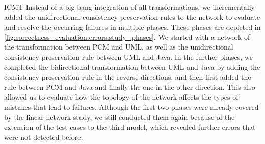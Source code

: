 \begin{copiedFrom}{ICMT}
Instead of a big bang integration of all transformations, we incrementally added the unidirectional consistency preservation rules to the network to evaluate and resolve the occurring failures in multiple phases.
These phases are depicted in \autoref{fig:correctness_evaluation:errors:study_phases}.
We started with a network of the transformation between \gls{PCM} and \gls{UML}, as well as the unidirectional consistency preservation rule between \gls{UML} and Java.
In the further phases, we completed the bidirectional transformation between \gls{UML} and Java by adding the consistency preservation rule in the reverse directions, and then first added the rule between \gls{PCM} and Java and finally the one in the other direction.
This also allowed us to evaluate how the topology of the network affects the types of mistakes that lead to failures.
Although the first two phases were already covered by the linear network study, we still conducted them again because of the extension of the test cases to the third model, which revealed further errors that were not detected before.






\end{copiedFrom}
